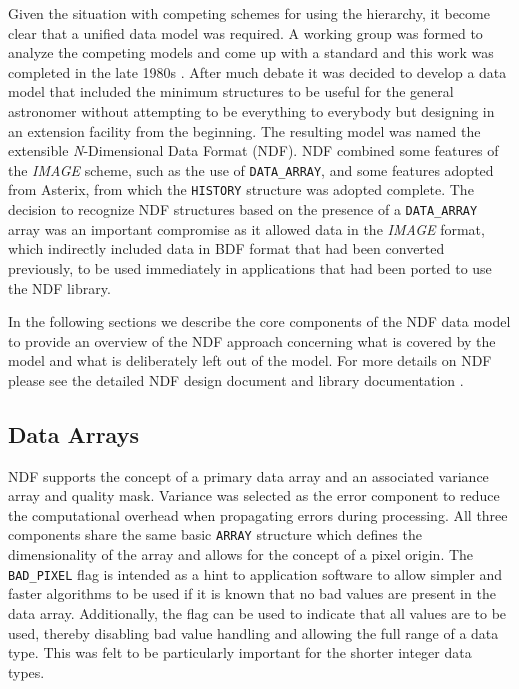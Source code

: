 \documentclass[final,authoryear,5p,times,twocolumn]{elsarticle}
\begin{document}
Given the situation with competing schemes for using the hierarchy, it
become clear that a unified data model was required. A working group
was formed to analyze the competing models and come up with a standard and this work
was completed in the late 1980s \citep{1988STARB...2...11C,SGP38}.
After much debate it was decided to develop a data model that included
the minimum structures to be useful for the general astronomer without
attempting to be everything to everybody but designing in an extension
facility from the beginning. The resulting model was named the
extensible \emph{N}-Dimensional Data Format (NDF).  NDF combined some
features of the \emph{IMAGE} scheme, such as the use of
\texttt{DATA\_ARRAY}, and some features adopted from Asterix, from
which the \texttt{HISTORY} structure was adopted complete.  The
decision to recognize NDF structures based on the presence of a
\texttt{DATA\_ARRAY} array was an important compromise as it allowed
data in the \emph{IMAGE} format, which indirectly included data in
BDF format that had been converted previously, to be used immediately
in applications that had been ported to use the NDF library.

In the following sections we describe the core components of the NDF
data model to provide an overview of the NDF approach concerning what
is covered by the model and what is deliberately left out of the
model. For more details on NDF please see the detailed NDF design
document \citep[SGP/38;][]{SGP38} and library documentation \citep[SUN/33;][]{SUN33}.

\subsection{Data Arrays}

NDF supports the concept of a primary data array and an associated
variance array and quality mask. Variance was selected as the error
component to reduce the computational overhead when propagating errors
during processing. All three components share the same
basic \texttt{ARRAY} structure which defines the dimensionality of the
array and allows for the concept of a pixel origin. The
\texttt{BAD\_PIXEL} flag is intended as a hint to application
software to allow simpler and faster algorithms to be used if it is known
that no bad values are present in the data array. Additionally, the flag
can be used to indicate that all values are to be used, thereby
disabling bad value handling and allowing the full range of a data
type. This was felt to be particularly important for the shorter
integer data types.
\end{document}
